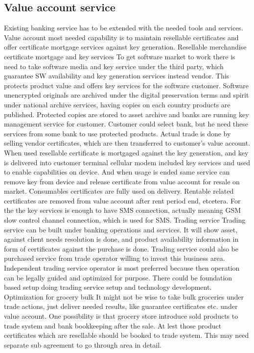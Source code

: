 \subsection{Value account service}
\label{value_account_service}

Existing banking service has to be extended with the needed tools and services. Value account most needed capability is to maintain resellable certificates and offer certificate mortgage services against key generation.
Resellable merchandise certificate mortgage and key services
To get software market to work there is need to take software media and key service under the third party, which guarantee SW availability and key generation services instead vendor. This protects product value and offers key services for the software customer. Software unencrypted originals are archived under the digital preservation terms and spirit under national archive services, having copies on each country products are published. Protected copies are stored to asset archive and banks are running key management service for customer. Customer could select bank, but he need these services from some bank to use protected products. Actual trade is done by selling vendor certificates, which are then transferred to customer's value account. When used resellable certificate is mortgaged against the key generation, and key is delivered into customer terminal cellular modem included key services and used to enable capabilities on device. And when usage is ended same service can remove key from device and release certificate from value account for resale on market. Consumables certificates are fully used on delivery. Rentable related certificates are removed from value account after rent period end, etcetera. For the the key services is enough to have SMS connection, actually meaning GSM slow control channel connection, which is used for SMS.
Trading service
Trading service can be built under banking operations and services. It will show asset, against client needs resolution is done, and product availability information in form of certificates against the purchase is done. Trading service could also be purchased service from trade operator willing to invest this business area. Independent trading service operator is most preferred because then operation can be legally guided and optimized for purpose. There could be foundation based setup doing trading service setup and technology development.
Optimization for grocery bulk
It might not be wise to take bulk groceries under trade actions, just deliver needed results, like guarantee certificates etc. under value account. One possibility is that grocery store introduce sold products to trade system and bank bookkeeping after the sale. At lest those product certificates which are resellable should be booked to trade system. This may need separate sub agreement to go through area in detail.

